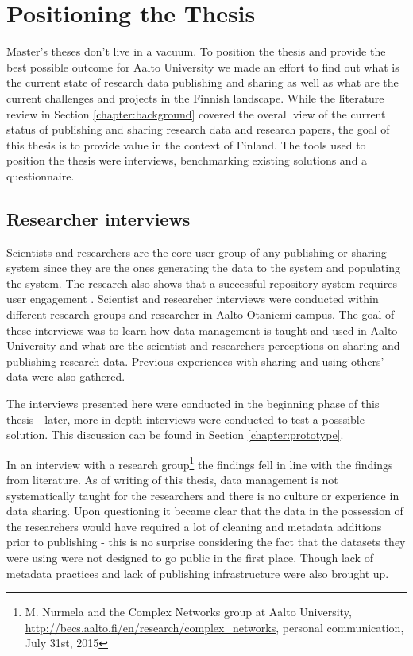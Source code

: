 \chapter{Positioning the Thesis}
\label{chapter:positioning}

Master's theses don't live in a vacuum. To position the thesis and provide the
best possible outcome for Aalto University we made an effort to find out what
is the current state of research data publishing and sharing as well as what
are the current challenges and projects in the Finnish landscape. While the
literature review in Section \ref{chapter:background} covered the overall view
of the current status of publishing and sharing research data and research
papers, the goal of this thesis is to provide value in the context of Finland.
The tools used to position the thesis were interviews, benchmarking existing
solutions and a questionnaire.

\section{Researcher interviews}
\label{sec:expert_interviews}

Scientists and researchers are the core user group of any publishing or sharing
system since they are the ones generating the data to the system and populating
the system. The research also shows that a successful repository system requires
user engagement \cite{DBLP:conf/ercimdl/Martinez-UribeM09}. Scientist and
researcher interviews were conducted within different research groups and
researcher in Aalto Otaniemi campus. The goal of these interviews was to learn
how data management is taught and used in Aalto University and what are the
scientist and researchers perceptions on sharing and publishing research data.
Previous experiences with sharing and using others' data were also gathered.

The interviews presented here were conducted in the beginning phase of this
thesis - later, more in depth interviews were conducted to test a posssible
solution. This discussion can be found in Section \ref{chapter:prototype}.

In an interview with a research group\footnote{M. Nurmela and the Complex
Networks group at Aalto University, \url{http://becs.aalto.fi/en/research/complex\_networks},
personal communication, July 31st, 2015} the findings fell in line with the
findings from literature. As of writing of this thesis, data management is not
systematically taught for the researchers and
there is no culture or experience in data sharing. Upon questioning it became
clear that the data in the possession of the researchers would have required
a lot of cleaning and metadata additions prior to publishing - this is no surprise
considering the fact that the datasets they were using were not designed to
go public in the first place. Though lack of metadata practices and lack of
publishing infrastructure were also brought up.

